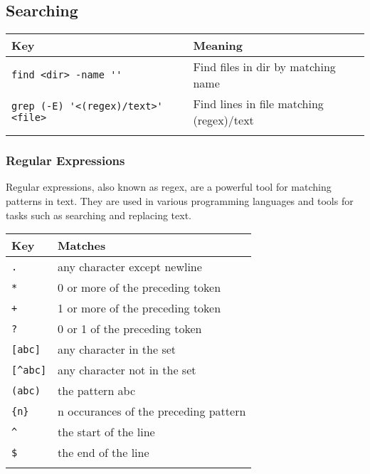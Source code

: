 \documentclass{article}
\begin{document}
\subsection{Searching}
\begin{table}[H]
    \begin{tabular}{ll}
        \textbf{Key}                                  & \textbf{Meaning}                         \\ \hline
        \lstinline|find <dir> -name ''|               & Find files in dir by matching name       \\ \arrayrulecolor{lightgray}\hline
        \lstinline|grep (-E) '<(regex)/text>' <file>| & Find lines in file matching (regex)/text \\ \arrayrulecolor{lightgray}\hline
    \end{tabular}
\end{table}

\subsubsection{Regular Expressions}

Regular expressions, also known as regex, are a powerful tool for matching patterns in text. They are used in various programming languages and tools for tasks such as searching and replacing text.

\begin{table}[H]
    \begin{tabular}{ll}
        \textbf{Key}       & \textbf{Matches}                      \\ \hline
        \lstinline|.|      & any character except newline          \\ \hline
        \lstinline|*|      & 0 or more of the preceding token      \\ \hline
        \lstinline|+|      & 1 or more of the preceding token      \\ \hline
        \lstinline|?|      & 0 or 1 of the preceding token         \\ \hline
        \lstinline|[abc]|  & any character in the set              \\ \hline
        \lstinline|[^abc]| & any character not in the set          \\ \hline
        \lstinline|(abc)|  & the pattern abc                       \\ \hline
        \lstinline|{n}|    & n occurances of the preceding pattern \\ \hline
        \lstinline|^|      & the start of the line                 \\ \hline
        \lstinline|$|      & the end of the line                   \\ \hline
    \end{tabular}
\end{table}
\end{document}
